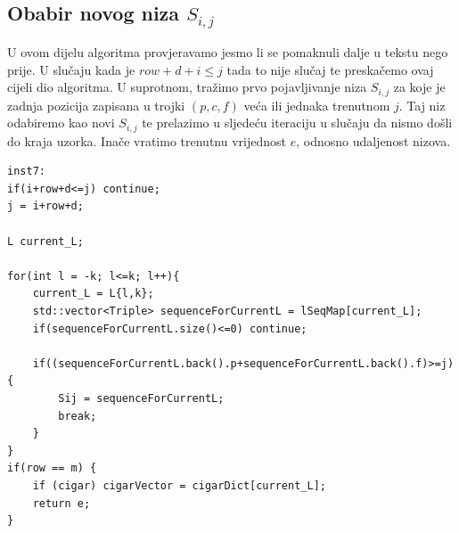 \documentclass[times, utf8, zavrsni]{fer}
\begin{document}
\subsection{Obabir novog niza $S_{i,j}$}
U ovom dijelu algoritma provjeravamo jesmo li se pomaknuli dalje u tekstu nego prije. U slučaju kada je $row+d+i\leq j$ tada to nije slučaj te preskačemo ovaj cijeli dio algoritma. U suprotnom, tražimo prvo pojavljivanje niza $S_{i,j}$ za koje je zadnja pozicija zapisana u trojki $(p,c,f)$ veća ili jednaka trenutnom $j$. Taj niz odabiremo kao novi $S_{i,j}$ te prelazimo u sljedeću iteraciju u slučaju da nismo došli do kraja uzorka. Inače vratimo trenutnu vrijednost $e$, odnosno udaljenost nizova.
\newline
\begin{lstlisting}
inst7:
if(i+row+d<=j) continue;
j = i+row+d;

L current_L;

for(int l = -k; l<=k; l++){
    current_L = L{l,k};
    std::vector<Triple> sequenceForCurrentL = lSeqMap[current_L];
    if(sequenceForCurrentL.size()<=0) continue;

    if((sequenceForCurrentL.back().p+sequenceForCurrentL.back().f)>=j) {
        Sij = sequenceForCurrentL;
        break;
    }
}
if(row == m) { 
    if (cigar) cigarVector = cigarDict[current_L]; 
    return e; 
}
\end{lstlisting}
\end{document}
